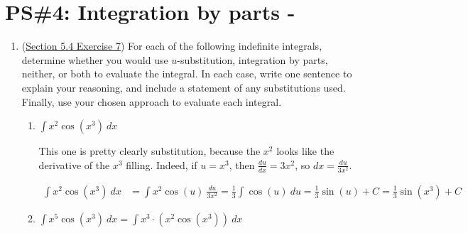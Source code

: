 


%


\allowdisplaybreaks
\section{PS\#4: Integration by parts -  }

\everymath{\displaystyle}
\begin{enumerate}[leftmargin=0pt]

\item (\href{https://activecalculus.org/single/sec-5-4-parts.html#CBY}{Section 5.4 Exercise 7})
For each of the following indefinite integrals, determine whether you would use 
$u$-substitution, integration by parts, neither, or both to evaluate the integral. In each case, write one sentence to explain your reasoning, and include a statement of any substitutions used. Finally, use your chosen approach to evaluate each integral.
\begin{enumerate}
    \item $\int x^2 \cos(x^3)\ dx$
    
    \begin{red}
    This one is pretty clearly substitution, because the $x^2$ looks like the derivative of the $x^3$ filling. Indeed, if $u = x^3$, then $\frac{du}{dx} = 3x^2$, so $dx = \frac{du}{3x^2}$.
    
    \begin{align*}
        \int x^2 \cos(x^3)\ dx &= \int x^2 \cos(u)\ \frac{du}{3x^2} = \frac13 \int \cos(u)\ du = \frac13 \sin(u) + C = \frac13 \sin(x^3) +C
    \end{align*}
    \end{red}
    
    \item $\int x^5 \cos(x^3)\ dx = \int x^3\cdot (x^2\cos(x^3))\ dx$
    

\end{enumerate}
\end{enumerate}
